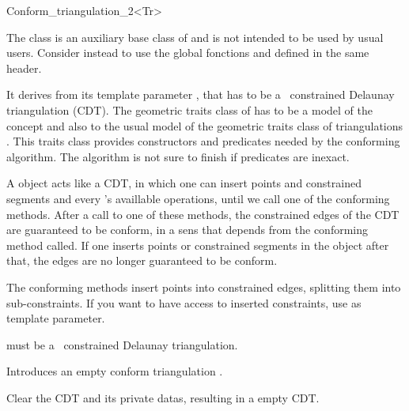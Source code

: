 \begin{ccRefClass}{Conform_triangulation_2<Tr>}

The class \ccRefName{} is an auxiliary base class of 
and is not intended to be used by usual users. Consider instead to use
the global fonctions  and
 defined in the same header.

It derives from its template parameter , that has to be a
\cgal\ constrained Delaunay triangulation (CDT). The geometric traits
class of  has to be a model of the concept
 and also to the usual model of the geometric
traits class of triangulations . This traits class provides
constructors and predicates needed by the conforming algorithm. The
algorithm is not sure to finish if predicates are inexact.

A \ccRefName{} object acts like a  CDT, in which one can
insert points and constrained segments and every 's availlable
operations, until we call one of the conforming methods. After a call
to one of these methods, the constrained edges of the CDT are
guaranteed to be conform, in a sens that depends from the conforming
method called.  If one inserts points or constrained segments in the
\ccRefName{} object after that, the edges are no longer guaranteed to
be conform.

The conforming methods insert points into constrained edges, splitting 
them into sub-constraints. If you want to have access to inserted
constraints, use  as
template parameter.


\ccInheritsFrom


\ccRequirements

 must be a \cgal\ constrained Delaunay triangulation.

\ccTypes 
{}

\ccCreation
{}

{Introduces an empty conform triangulation \ccVar.}

\ccOperations

{ Clear the CDT and its private datas, resulting in a empty CDT. }




\end{ccRefClass}
